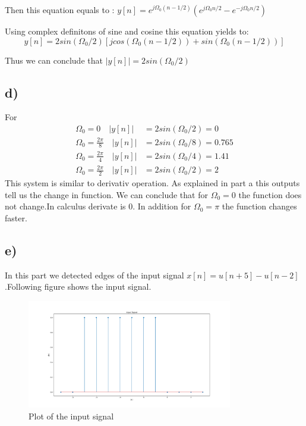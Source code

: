 \documentclass[letterpaper,12pt]{article}
\begin{document}
 Then this equation equals to : \(y[n]= e^{j \Omega_0 (n-1/2)}(e^{j \Omega_0 n/2}-e^{-j \Omega_0 n/2})\)

 Using complex definitons of sine and cosine this equation yields to: \[y[n]= 2sin(\Omega_0 /2)[jcos(\Omega_0 (n-1/2))+sin(\Omega_0 (n-1/2))]\]

 Thus we can conclude that $|y[n]|= 2sin(\Omega_0 /2)$

\subsection{d)}

For \begin{equation}
    \begin{split}
        \Omega_0 = 0 \quad |y[n]|&= 2sin(\Omega_0 /2)=0\\
 \Omega_0 = \frac{2\pi}{8} \quad |y[n]|&= 2sin(\Omega_0 /8)=0.765\\
 \Omega_0 = \frac{2\pi}{4} \quad |y[n]|&= 2sin(\Omega_0 /4)=1.41\\
 \Omega_0 = \frac{2\pi}{2} \quad |y[n]|&= 2sin(\Omega_0 /2)=2
    \end{split}
\end{equation}
This system is similar to derivativ operation. As explained in part a this outputs tell us the change in function. We can conclude that for \( \Omega_0 = 0\) the function does not change.In calculus derivate is 0. In addition for  \( \Omega_0 = \pi \) the function changes faster.
\subsection{e)}
In this part we detected edges of the input signal \(x[n] = u[n+5] - u[n-2]\).Following figure shows the input signal.
\begin{figure}[H]
    \centering
    \includegraphics[width = 0.8\textwidth]{Input_Signal_3e.png}
    \caption{Plot of the input signal}
    \end{figure} 
 
\end{document}
